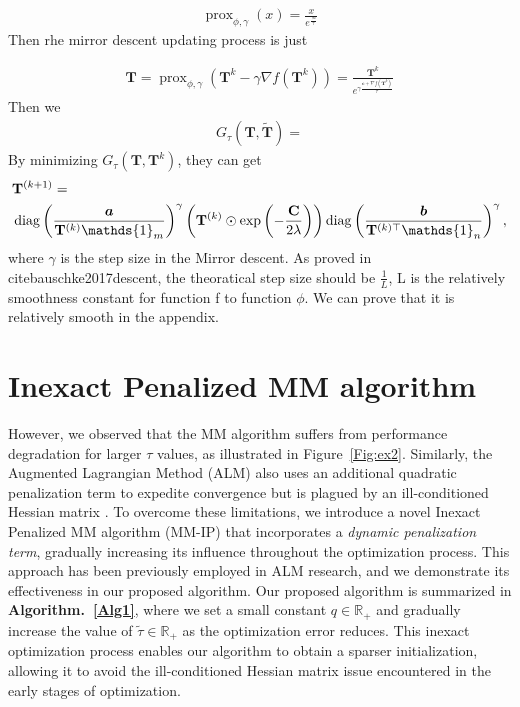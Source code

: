 \documentclass[conference]{IEEEtran}
\newcommand{\R}{\mathbb{R}}
\newcommand{\one}{\mathds{1}}
\newcommand{\mat}[1]{\mathbf{#1}}
\renewcommand{\vec}[1]{\bm{#1}}
\newcommand{\prox}{\operatorname{prox}}
\begin{document}
\begin{align}
\prox_{\phi,\gamma}(x) =  \frac{x}{e^{\frac{\gamma \mat c}{\tau}}}
\end{align}
Then rhe mirror descent updating process is just

\begin{align}
\mat T = \prox_{\phi,\gamma}(\mat T^{k} - \gamma \nabla f(\mat T^{k})) =  \frac{\mat T^{k}}{e^{\gamma \frac{\mat c + \nabla f(\mat T^{k})}{\tau}}}
\end{align}
Then we
\begin{align}
\label{eq:af}
G_{\tau}(\mat T, \tilde{\mat T}) = 
\end{align}
By minimizing $G_{\tau}(\mat T, \mat T^{k}) $, they can get
\begin{align}
\label{eq:update}
&\mat{T}^{(k+1)}=\notag\\
&\operatorname{diag}\left(\frac{\vec a}{\mat{T}^{(k)} \one_m}\right)^{\gamma}\left(\mat{T}^{(k)} \odot \exp \left(-\frac{\mat C}{2 \lambda}\right)\right)
\operatorname{diag}\left(\frac{\vec{b}}{\mat{T}^{(k) \top} \one_n}\right)^{\gamma},\notag\\
\end{align}
where $\gamma$ is the step size in the Mirror descent. 
As proved in cite{bauschke2017descent}, the theoratical step size should be $\frac{1}{L}$, L is the relatively smoothness constant for function f to function $\phi$.
We can prove that it is relatively smooth in the appendix.
\section{Inexact Penalized MM algorithm}
However, we observed that the MM algorithm suffers from performance degradation for larger $\tau$ values, as illustrated in Figure~\ref{Fig:ex2}. Similarly, the Augmented Lagrangian Method (ALM) also uses an additional quadratic penalization term to expedite convergence but is plagued by an ill-conditioned Hessian matrix \cite{doi:10.1137/1.9781611973365}.
To overcome these limitations, we introduce a novel Inexact Penalized MM algorithm (MM-IP) that incorporates a {\it dynamic penalization term}, gradually increasing its influence throughout the optimization process. This approach has been previously employed in ALM research, and we demonstrate its effectiveness in our proposed algorithm. Our proposed algorithm is summarized in {\bf Algorithm.~\ref{Alg1}}, where we set a small constant $q \in \R_+ $ and gradually increase the value of $\tilde{\tau}\in \R_+$ as the optimization error reduces. This inexact optimization process enables our algorithm to obtain a sparser initialization, allowing it to avoid the ill-conditioned Hessian matrix issue encountered in the early stages of optimization.
\end{document}
